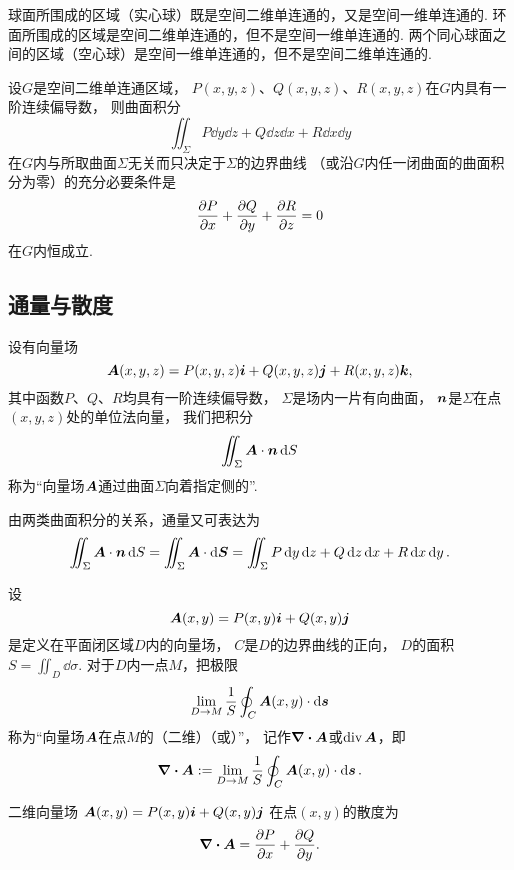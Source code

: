 \begin{example}
球面所围成的区域（实心球）既是空间二维单连通的，又是空间一维单连通的.
环面所围成的区域是空间二维单连通的，但不是空间一维单连通的.
两个同心球面之间的区域（空心球）是空间一维单连通的，但不是空间二维单连通的.
\end{example}

\begin{theorem}\label{theorem:线积分与面积分.沿任意闭曲面的曲面积分为零的条件}
设\(G\)是空间二维单连通区域，
\(P(x,y,z)\)、\(Q(x,y,z)\)、\(R(x,y,z)\)在\(G\)内具有一阶连续偏导数，
则曲面积分\[
	\iint_\Sigma P\dd{y}\dd{z}+Q\dd{z}\dd{x}+R\dd{x}\dd{y}
\]
在\(G\)内与所取曲面\(\Sigma\)无关而只决定于\(\Sigma\)的边界曲线
（或沿\(G\)内任一闭曲面的曲面积分为零）的充分必要条件是\[
	\pdv{P}{x}+\pdv{Q}{y}+\pdv{R}{z} = 0
\]在\(G\)内恒成立.
\end{theorem}

\subsection{通量与散度}
\begin{definition}
设有向量场\[
	\boldsymbol{A}(x,y,z)=P(x,y,z)\boldsymbol{i}+Q(x,y,z)\boldsymbol{j}+R(x,y,z)\boldsymbol{k},
\]
其中函数\(P\)、\(Q\)、\(R\)均具有一阶连续偏导数，
\(\Sigma\)是场内一片有向曲面，
\(\boldsymbol{n}\)是\(\Sigma\)在点\((x,y,z)\)处的单位法向量，
我们把积分\[
	\iint_\Sigma \boldsymbol{A}\cdot\boldsymbol{n}\dd{S}
\]称为“向量场\(\boldsymbol{A}\)通过曲面\(\Sigma\)向着指定侧的”.
\end{definition}
由两类曲面积分的关系，通量又可表达为\[
	\iint_\Sigma \boldsymbol{A}\cdot\boldsymbol{n}\dd{S}
	=\iint_\Sigma \boldsymbol{A}\cdot\dd{\boldsymbol{S}}
	=\iint_\Sigma P\dd{y}\dd{z}+Q\dd{z}\dd{x}+R\dd{x}\dd{y}.
\]

\begin{definition}[平面上的散度]
\def\defofdiv{\lim_{D \to M} \frac{1}{S} \oint_C \vb{A}(x,y) \cdot \dd{\vb{s}}}%
设\[
	\boldsymbol{A}(x,y)=P(x,y)\boldsymbol{i}+Q(x,y)\boldsymbol{j}
\]是定义在平面闭区域\(D\)内的向量场，
\(C\)是\(D\)的边界曲线的正向，
\(D\)的面积\(S = \iint_{D} \dd{\sigma}\).
对于\(D\)内一点\(M\)，把极限\[
	\defofdiv
\]称为“向量场\(\boldsymbol{A}\)在点\(M\)的（二维）（或）”，
记作\(\div{\boldsymbol{A}}\)或\(\operatorname{div}\boldsymbol{A}\)，即\[
	\div{\vb{A}} \defeq \defofdiv.
\]
\end{definition}

\begin{proposition}
二维向量场
\(\boldsymbol{A}(x,y)=P(x,y)\boldsymbol{i}+Q(x,y)\boldsymbol{j}\)
在点\((x,y)\)的散度为\[
	\div{\boldsymbol{A}} = \pdv{P}{x}+\pdv{Q}{y}.
\]
\end{proposition}

